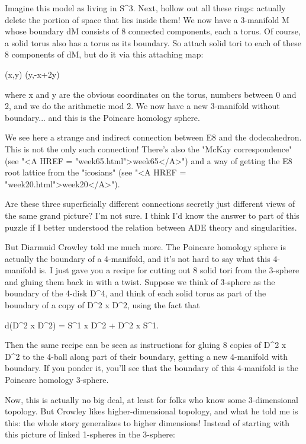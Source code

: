 Imagine this model as living in S^{3}.  Next, hollow out all
these rings: actually delete the portion of space that lies inside them!
We now have a 3-manifold M whose boundary dM consists of 8 connected
components, each a torus.  Of course, a solid torus also has a torus as
its boundary.  So attach solid tori to each of these 8 components of dM,
but do it via this attaching map:

(x,y) \to  (y,-x+2y)

where x and y are the obvious coordinates on the torus, numbers between 
0 and 2\pi , and we do the arithmetic mod 2\pi .  We now have a new 3-manifold 
without boundary... and this is the Poincare homology sphere.

We see here a strange and indirect connection between E8 and the
dodecahedron.  This is not the only such connection!  There's also the
"McKay correspondence" (see "<A HREF =
"week65.html">week65</A>") and a way of getting the E8 root lattice
from the "icosians" (see "<A HREF =
"week20.html">week20</A>").

Are these three superficially different connections secretly just 
different views of the same grand picture?   I'm not sure.  I think
I'd know the answer to part of this puzzle if I better understood
the relation between ADE theory and singularities.  

But Diarmuid Crowley told me much more.   The Poincare homology sphere
is actually the boundary of a 4-manifold, and it's not hard to say what
this 4-manifold is.  I just gave you a recipe for cutting out 8 solid
tori from the 3-sphere and gluing them back in with a twist.  Suppose 
we think of 3-sphere as the boundary of the 4-disk D^{4}, and think of 
each solid torus as part of the boundary of a copy of D^{2} x D^{2}, using
the fact that

d(D^{2} x D^{2}) = S^{1} x D^{2} + D^{2} x S^{1}.

Then the same recipe can be seen as instructions for gluing 8 copies 
of D^{2} x D^{2} to the 4-ball along part of their boundary, getting a new 
4-manifold with boundary.  If you ponder it, you'll see that the 
boundary of this 4-manifold is the Poincare homology 3-sphere.

Now, this is actually no big deal, at least for folks who know some
3-dimensional topology.  But Crowley likes higher-dimensional topology,
and what he told me is this: the whole story generalizes to higher 
dimensions!  Instead of starting with this picture of linked 1-spheres 
in the 3-sphere:

